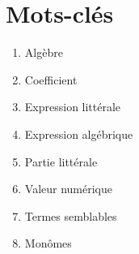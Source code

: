 \documentclass[../../syllabus_1.tex]{subfiles}
\begin{document}
\newpage
\section*{Mots-clés}
\begin{enumerate}[cols=2, label=\textbf{\arabic*.}]
    \item Algèbre
    \item Coefficient
    \item Expression littérale
    \item Expression algébrique
    \item Partie littérale
    \item Valeur numérique
    \item Termes semblables
    \item Monômes
\end{enumerate}
\end{document}
